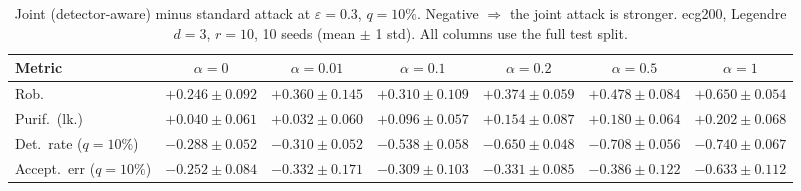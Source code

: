 \begin{table}[htbp]
  \centering
  \small
  \begin{tabular}{@{}lcccccc@{}}
    \toprule
    Metric & $\alpha{=}0$ & $\alpha{=}0.01$ & $\alpha{=}0.1$ & $\alpha{=}0.2$ & $\alpha{=}0.5$ & $\alpha{=}1$ \\
    \midrule
    Rob. & $+0.246 \pm 0.092$ & $+0.360 \pm 0.145$ & $+0.310 \pm 0.109$ & $+0.374 \pm 0.059$ & $+0.478 \pm 0.084$ & $+0.650 \pm 0.054$ \\
    Purif.\ (lk.) & $+0.040 \pm 0.061$ & $+0.032 \pm 0.060$ & $+0.096 \pm 0.057$ & $+0.154 \pm 0.087$ & $+0.180 \pm 0.064$ & $+0.202 \pm 0.068$ \\
    Det.\ rate ($q{=}10\%$) & $-0.288 \pm 0.052$ & $-0.310 \pm 0.052$ & $-0.538 \pm 0.058$ & $-0.650 \pm 0.048$ & $-0.708 \pm 0.056$ & $-0.740 \pm 0.067$ \\
    Accept.\ err ($q{=}10\%$) & $-0.252 \pm 0.084$ & $-0.332 \pm 0.171$ & $-0.309 \pm 0.103$ & $-0.331 \pm 0.085$ & $-0.386 \pm 0.122$ & $-0.633 \pm 0.112$ \\
    \bottomrule
  \end{tabular}
  \caption{Joint (detector-aware) minus standard attack at $\varepsilon=0.3$, $q{=}10\%$. Negative $\Rightarrow$ the joint attack is stronger. ecg200, Legendre $d{=}3$, $r{=}10$, 10 seeds (mean $\pm$ 1 std). All columns use the full test split.}
  \label{tab:ecg200_joint_r10_eps0.3}
\end{table}
